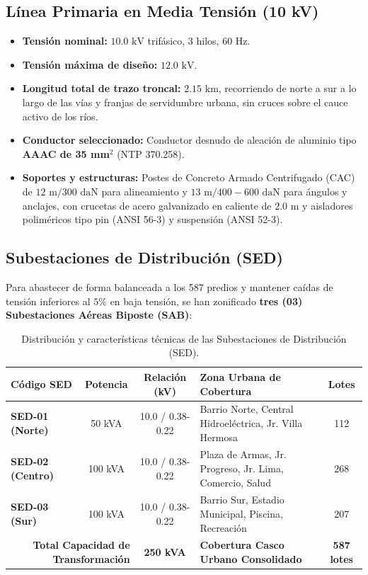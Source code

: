 \subsection{Línea Primaria en Media Tensión (10 kV)}
\begin{itemize}
  \item \textbf{Tensión nominal:} $10.0\text{ kV}$ trifásico, 3 hilos, $60\text{ Hz}$.
  \item \textbf{Tensión máxima de diseño:} $12.0\text{ kV}$.
  \item \textbf{Longitud total de trazo troncal:} $2.15\text{ km}$, recorriendo de norte a sur a lo largo de las vías y franjas de servidumbre urbana, sin cruces sobre el cauce activo de los ríos.
  \item \textbf{Conductor seleccionado:} Conductor desnudo de aleación de aluminio tipo \textbf{AAAC de 35 mm$^2$} (NTP 370.258).
  \item \textbf{Soportes y estructuras:} Postes de Concreto Armado Centrifugado (CAC) de $12\text{ m}/300\text{ daN}$ para alineamiento y $13\text{ m}/400-600\text{ daN}$ para ángulos y anclajes, con crucetas de acero galvanizado en caliente de $2.0\text{ m}$ y aisladores poliméricos tipo pin (ANSI 56-3) y suspensión (ANSI 52-3).
\end{itemize}

\subsection{Subestaciones de Distribución (SED)}
Para abastecer de forma balanceada a los 587 predios y mantener caídas de tensión inferiores al $5\%$ en baja tensión, se han zonificado \textbf{tres (03) Subestaciones Aéreas Biposte (SAB)}:

\begin{table}[H]
\centering
\small
\begin{tabular}{|l|c|c|l|c|}
\hline
\textbf{Código SED} & \textbf{Potencia} & \textbf{Relación (kV)} & \textbf{Zona Urbana de Cobertura} & \textbf{Lotes} \\
\hline
\textbf{SED-01 (Norte)} & 50 kVA & 10.0 / 0.38-0.22 & Barrio Norte, Central Hidroeléctrica, Jr. Villa Hermosa & 112 \\
\textbf{SED-02 (Centro)} & 100 kVA & 10.0 / 0.38-0.22 & Plaza de Armas, Jr. Progreso, Jr. Lima, Comercio, Salud & 268 \\
\textbf{SED-03 (Sur)} & 100 kVA & 10.0 / 0.38-0.22 & Barrio Sur, Estadio Municipal, Piscina, Recreación & 207 \\
\hline
\multicolumn{2}{|r|}{\textbf{Total Capacidad de Transformación}} & \textbf{250 kVA} & \textbf{Cobertura Casco Urbano Consolidado} & \textbf{587 lotes} \\
\hline
\end{tabular}
\caption{Distribución y características técnicas de las Subestaciones de Distribución (SED).}
\end{table}

